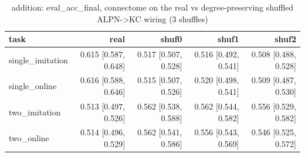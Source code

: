 \begin{table}[t]
\centering
\small
\begin{tabular}{lrrrr}
\toprule
task & real & shuf0 & shuf1 & shuf2 \\
\midrule
single\_imitation & 0.615 [0.587, 0.648] & 0.517 [0.507, 0.528] & 0.516 [0.492, 0.541] & 0.508 [0.488, 0.528] \\
single\_online & 0.616 [0.588, 0.646] & 0.515 [0.507, 0.526] & 0.520 [0.498, 0.541] & 0.509 [0.487, 0.530] \\
two\_imitation & 0.513 [0.497, 0.526] & 0.562 [0.538, 0.588] & 0.562 [0.544, 0.582] & 0.556 [0.529, 0.582] \\
two\_online & 0.514 [0.496, 0.529] & 0.562 [0.541, 0.586] & 0.556 [0.543, 0.569] & 0.546 [0.525, 0.572] \\
\bottomrule
\end{tabular}
\caption{addition: eval\_acc\_final, connectome on the real vs degree-preserving shuffled ALPN->KC wiring (3 shuffles)}
\label{tab:wiring_addition}
\end{table}